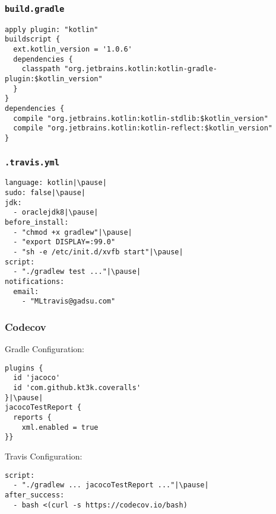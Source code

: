 


\begin{frame}[fragile] \frametitle{\texttt{build.gradle}}
\begin{lstlisting}
apply plugin: "kotlin"
buildscript {
  ext.kotlin_version = '1.0.6'
  dependencies {
    classpath "org.jetbrains.kotlin:kotlin-gradle-plugin:$kotlin_version"
  }
}
dependencies {
  compile "org.jetbrains.kotlin:kotlin-stdlib:$kotlin_version"
  compile "org.jetbrains.kotlin:kotlin-reflect:$kotlin_version"
}
\end{lstlisting}
\end{frame}


\begin{frame}[fragile] \frametitle{\texttt{.travis.yml}}
\begin{lstlisting}
language: kotlin|\pause|
sudo: false|\pause|
jdk:
  - oraclejdk8|\pause|
before_install:
  - "chmod +x gradlew"|\pause|
  - "export DISPLAY=:99.0"
  - "sh -e /etc/init.d/xvfb start"|\pause|
script:
  - "./gradlew test ..."|\pause|
notifications:
  email:
    - "MLtravis@gadsu.com"
\end{lstlisting}
\end{frame}


\begin{frame}[fragile] \frametitle{Codecov} 
Gradle Configuration:

\begin{lstlisting}
plugins {
  id 'jacoco'
  id 'com.github.kt3k.coveralls'
}|\pause|
jacocoTestReport {
  reports {
    xml.enabled = true
}}
\end{lstlisting}
\pause

Travis Configuration:

\begin{lstlisting}
script:
  - "./gradlew ... jacocoTestReport ..."|\pause|
after_success:
  - bash <(curl -s https://codecov.io/bash)
\end{lstlisting}


\end{frame}


